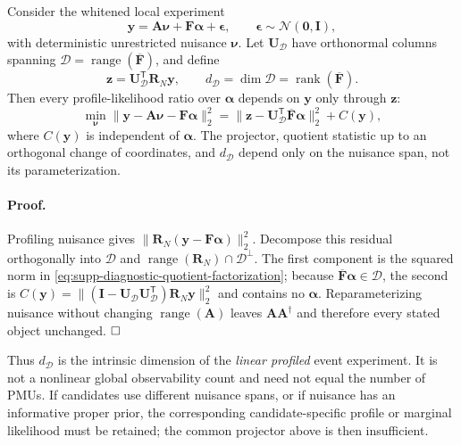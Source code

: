 \begin{theorem}
Consider the whitened local experiment
\begin{equation}
 \bm y=\bm A\bm\nu+\bm F\bm\alpha+\bm\epsilon,
 \qquad \bm\epsilon\sim\mathcal N(\bm0,\bm I),
 \label{eq:supp-diagnostic-quotient-model}
\end{equation}
with deterministic unrestricted nuisance $\bm\nu$. Let
$\bm U_{\mathcal D}$ have orthonormal columns spanning
$\mathcal D=\operatorname{range}(\overline{\bm F})$, and define
\begin{equation}
 \bm z=\bm U_{\mathcal D}^{\mathsf T}\bm R_N\bm y,
 \qquad d_{\mathcal D}=\dim\mathcal D
 =\operatorname{rank}(\overline{\bm F}).
 \label{eq:supp-diagnostic-quotient-statistic}
\end{equation}
Then every profile-likelihood ratio over $\bm\alpha$ depends on $\bm y$ only
through $\bm z$:
\begin{equation}
 \min_{\bm\nu}\|\bm y-\bm A\bm\nu-\bm F\bm\alpha\|_2^2
 =\|\bm z-\bm U_{\mathcal D}^{\mathsf T}
       \overline{\bm F}\bm\alpha\|_2^2+C(\bm y),
 \label{eq:supp-diagnostic-quotient-factorization}
\end{equation}
where $C(\bm y)$ is independent of $\bm\alpha$. The projector, quotient
statistic up to an orthogonal change of coordinates, and
$d_{\mathcal D}$ depend only on the nuisance span, not its parameterization.
\label{thm:supp-diagnostic-quotient}
\end{theorem}

\paragraph{Proof.}
Profiling nuisance gives
$\|\bm R_N(\bm y-\bm F\bm\alpha)\|_2^2$. Decompose this residual orthogonally
into $\mathcal D$ and
$\operatorname{range}(\bm R_N)\cap\mathcal D^{\perp}$. The first component is
the squared norm in \eqref{eq:supp-diagnostic-quotient-factorization}; because
$\overline{\bm F}\bm\alpha\in\mathcal D$, the second is
$C(\bm y)=\|(\bm I-\bm U_{\mathcal D}\bm U_{\mathcal D}^{\mathsf T})
\bm R_N\bm y\|_2^2$ and contains no $\bm\alpha$. Reparameterizing nuisance
without changing $\operatorname{range}(\bm A)$ leaves
$\bm A\bm A^{\dagger}$ and therefore every stated object unchanged. $\hfill\square$

Thus $d_{\mathcal D}$ is the intrinsic dimension of the \emph{linear profiled}
event experiment. It is not a nonlinear global observability count and need
not equal the number of PMUs. If candidates use different nuisance spans, or if
nuisance has an informative proper prior, the corresponding candidate-specific
profile or marginal likelihood must be retained; the common projector above is
then insufficient.

